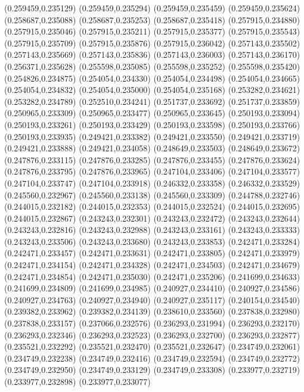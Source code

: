 (0.259459,0.235129)
(0.259459,0.235294)
(0.259459,0.235459)
(0.259459,0.235624)
(0.258687,0.235088)
(0.258687,0.235253)
(0.258687,0.235418)
(0.257915,0.234880)
(0.257915,0.235046)
(0.257915,0.235211)
(0.257915,0.235377)
(0.257915,0.235543)
(0.257915,0.235709)
(0.257915,0.235876)
(0.257915,0.236042)
(0.257143,0.235502)
(0.257143,0.235669)
(0.257143,0.235836)
(0.257143,0.236003)
(0.257143,0.236170)
(0.256371,0.235628)
(0.255598,0.235085)
(0.255598,0.235252)
(0.255598,0.235420)
(0.254826,0.234875)
(0.254054,0.234330)
(0.254054,0.234498)
(0.254054,0.234665)
(0.254054,0.234832)
(0.254054,0.235000)
(0.254054,0.235168)
(0.253282,0.234621)
(0.253282,0.234789)
(0.252510,0.234241)
(0.251737,0.233692)
(0.251737,0.233859)
(0.250965,0.233309)
(0.250965,0.233477)
(0.250965,0.233645)
(0.250193,0.233094)
(0.250193,0.233261)
(0.250193,0.233429)
(0.250193,0.233598)
(0.250193,0.233766)
(0.250193,0.233935)
(0.249421,0.233382)
(0.249421,0.233550)
(0.249421,0.233719)
(0.249421,0.233888)
(0.249421,0.234058)
(0.248649,0.233503)
(0.248649,0.233672)
(0.247876,0.233115)
(0.247876,0.233285)
(0.247876,0.233455)
(0.247876,0.233624)
(0.247876,0.233795)
(0.247876,0.233965)
(0.247104,0.233406)
(0.247104,0.233577)
(0.247104,0.233747)
(0.247104,0.233918)
(0.246332,0.233358)
(0.246332,0.233529)
(0.245560,0.232967)
(0.245560,0.233138)
(0.245560,0.233309)
(0.244788,0.232746)
(0.244015,0.232182)
(0.244015,0.232353)
(0.244015,0.232524)
(0.244015,0.232695)
(0.244015,0.232867)
(0.243243,0.232301)
(0.243243,0.232472)
(0.243243,0.232644)
(0.243243,0.232816)
(0.243243,0.232988)
(0.243243,0.233161)
(0.243243,0.233333)
(0.243243,0.233506)
(0.243243,0.233680)
(0.243243,0.233853)
(0.242471,0.233284)
(0.242471,0.233457)
(0.242471,0.233631)
(0.242471,0.233805)
(0.242471,0.233979)
(0.242471,0.234154)
(0.242471,0.234328)
(0.242471,0.234503)
(0.242471,0.234679)
(0.242471,0.234854)
(0.242471,0.235030)
(0.242471,0.235206)
(0.241699,0.234633)
(0.241699,0.234809)
(0.241699,0.234985)
(0.240927,0.234410)
(0.240927,0.234586)
(0.240927,0.234763)
(0.240927,0.234940)
(0.240927,0.235117)
(0.240154,0.234540)
(0.239382,0.233962)
(0.239382,0.234139)
(0.238610,0.233560)
(0.237838,0.232980)
(0.237838,0.233157)
(0.237066,0.232576)
(0.236293,0.231994)
(0.236293,0.232170)
(0.236293,0.232346)
(0.236293,0.232523)
(0.236293,0.232700)
(0.236293,0.232877)
(0.235521,0.232292)
(0.235521,0.232470)
(0.235521,0.232647)
(0.234749,0.232061)
(0.234749,0.232238)
(0.234749,0.232416)
(0.234749,0.232594)
(0.234749,0.232772)
(0.234749,0.232950)
(0.234749,0.233129)
(0.234749,0.233308)
(0.233977,0.232719)
(0.233977,0.232898)
(0.233977,0.233077)
